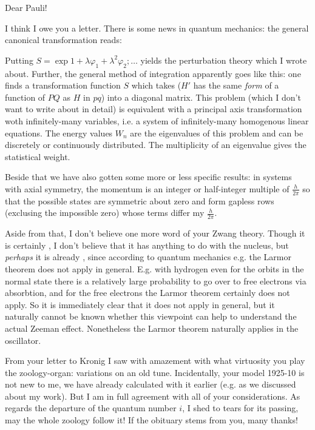 \date{October 12, 1925}

Dear Pauli!

I think I owe you a letter. There is some news in quantum mechanics: the general canonical transformation reads:


Putting $S=\exp{1+\lambda\varphi_1 + \lambda^2\varphi_2};\dots$ yields the perturbation theory which I wrote about. Further, the general method of integration apparently goes like this: one finds a transformation function $S$ which takes
($H'$ has the same \textit{form} of a function of $PQ$ as $H$ in $pq$) into a diagonal matrix. This problem (which I don't want to write about in detail) is equivalent with a principal axis transformation woth infinitely-many variables, i.e. a system of infinitely-many homogenous linear equations. The energy values $W_n$ are the eigenvalues of this problem and can be discretely or continuously distributed. The multiplicity of an eigenvalue gives the statistical weight.

Beside that we have also gotten some more or less specific results: in systems with axial symmetry, the momentum is an integer or half-integer multiple of $\frac{h}{2\pi}$ so that the possible states are symmetric about zero and form gapless rows (exclusing the impossible zero) whose terms differ my $\frac{h}{2\pi}$.

Aside from that, I don't believe one more word of your Zwang theory. Though it is certainly , I don't believe that it has anything to do with the nucleus, but \textit{
perhaps} it is already , since according to quantum mechanics e.g. the Larmor theorem does not apply in general. E.g. with hydrogen even for the orbits in the normal state there is a relatively large probability to go over to free electrons via absorbtion, and for the free electrons the Larmor theorem certainly does not apply. So it is immediately clear that it does not apply in general, but it naturally cannot be known whether this viewpoint can help to understand the actual Zeeman effect. Nonetheless the Larmor theorem naturally applies in the oscillator.

From your letter to Kronig I saw with amazement with what virtuosity you play the zoology-organ: variations on an old tune. Incidentally, your model 1925-10 is not new to me, we have already calculated with it earlier (e.g. as we discussed about my work). But I am in full agreement with all of your considerations. As regards the departure of the quantum number $i$, I shed to tears for its passing, may the whole zoology follow it! If the  obituary stems from you, many thanks! 


